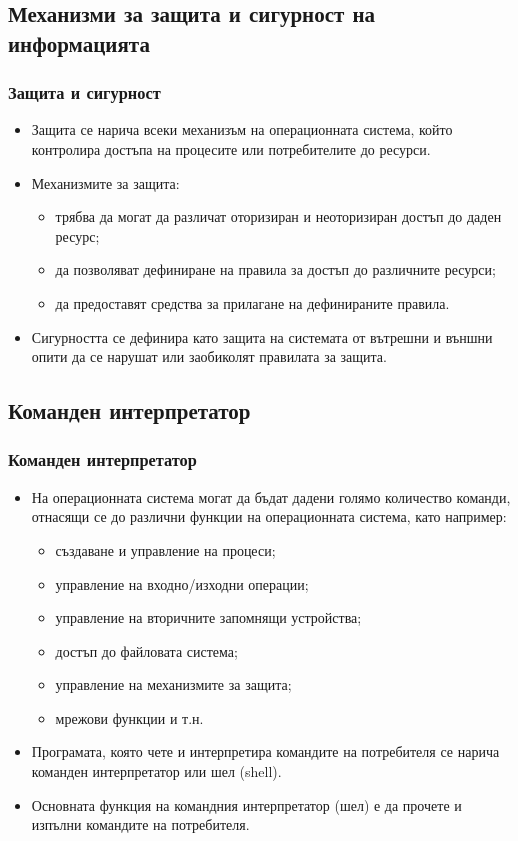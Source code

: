 \documentclass[ignorenonframetext, hyperref=unicode]{beamer}
\begin{document}
\subsection{Механизми за защита и сигурност на информацията}
\begin{frame}
\frametitle{Защита и сигурност}
\begin{itemize}
\item Защита се нарича всеки механизъм на операционната система, който контролира
достъпа на процесите или потребителите до ресурси.
\item Механизмите за защита:
\begin{itemize}
  \item трябва да могат да различат оторизиран и неоторизиран достъп до даден
  ресурс;
  \item да позволяват дефиниране на правила за достъп до различните ресурси;
  \item да предоставят средства за прилагане на дефинираните правила.
\end{itemize}
\item Сигурността се дефинира като защита на системата от вътрешни и външни
  опити да се нарушат или заобиколят правилата за защита.
\end{itemize}
\end{frame}


\subsection{Команден интерпретатор}
\begin{frame}
\frametitle{Команден интерпретатор}
\begin{itemize}
\item На операционната система могат да бъдат дадени голямо количество команди,
отнасящи се до различни функции на операционната система, като например:
\begin{itemize}
  \item създаване и управление на процеси;
  \item управление на входно/изходни операции;
  \item управление на вторичните запомнящи устройства;
  \item достъп до файловата система;
  \item управление на механизмите за защита;
  \item мрежови функции и т.н.
\end{itemize}
\item Програмата, която чете и интерпретира командите на потребителя се нарича
команден интерпретатор или шел (shell).
\item Основната функция на командния интерпретатор (шел) е да прочете и изпълни
командите на потребителя.
\end{itemize}
\end{frame}
\end{document}
